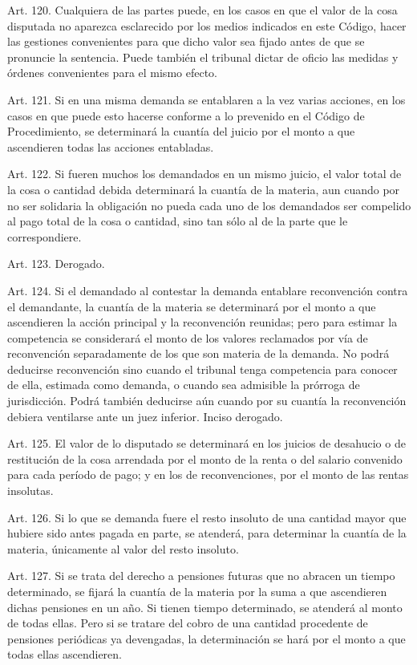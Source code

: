     Art. 120. Cualquiera de las partes puede, en los casos en que el valor de la cosa disputada no aparezca esclarecido por los medios indicados en este Código, hacer las gestiones convenientes para que dicho valor sea fijado antes de que se pronuncie la sentencia.
    Puede también el tribunal dictar de oficio las medidas y órdenes convenientes para el mismo efecto.


    Art. 121. Si en una misma demanda se entablaren a la vez varias acciones, en los casos en que puede esto hacerse conforme a lo prevenido en el Código de Procedimiento, se determinará la cuantía del juicio por el monto a que ascendieren todas las acciones entabladas.

    Art. 122. Si fueren muchos los demandados en un mismo juicio, el valor total de la cosa o cantidad debida determinará la cuantía de la materia, aun cuando por no ser solidaria la obligación no pueda cada uno de los demandados ser compelido al pago total de la cosa o cantidad, sino tan sólo al de la parte que le correspondiere.

    Art. 123. Derogado.

    Art. 124. Si el demandado al contestar la demanda entablare reconvención contra el demandante, la cuantía de la materia se determinará por el monto a que ascendieren la acción principal y la reconvención reunidas; pero para estimar la competencia se considerará el monto de los valores reclamados por vía de reconvención separadamente de los que son materia de la demanda.
    No podrá deducirse reconvención sino cuando el tribunal tenga competencia para conocer de ella, estimada como demanda, o cuando sea admisible la prórroga de jurisdicción. Podrá también deducirse aún cuando por su cuantía la reconvención debiera ventilarse ante un juez inferior.
    Inciso derogado.


    Art. 125. El valor de lo disputado se determinará en los juicios de desahucio o de restitución de la cosa arrendada por el monto de la renta o del salario convenido para cada período de pago; y en los de reconvenciones, por el monto de las rentas insolutas.


    Art. 126. Si lo que se demanda fuere el resto insoluto de una cantidad mayor que hubiere sido antes pagada en parte, se atenderá, para determinar la cuantía de la materia, únicamente al valor del resto insoluto.

    Art. 127. Si se trata del derecho a pensiones futuras que no abracen un tiempo determinado, se fijará la cuantía de la materia por la suma a que ascendieren dichas pensiones en un año. Si tienen tiempo determinado, se atenderá al monto de todas ellas.
    Pero si se tratare del cobro de una cantidad procedente de pensiones periódicas ya devengadas, la determinación se hará por el monto a que todas ellas ascendieren.


